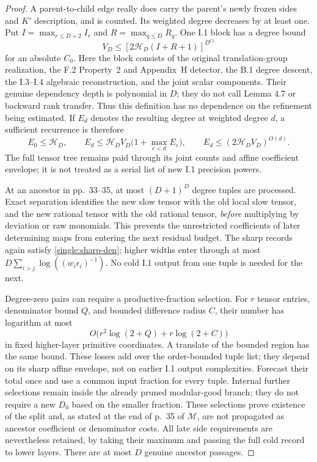 \documentclass[11pt,a4paper]{article}
\theoremstyle{definition}
\newcommand{\M}{\mathcal M}
\begin{document}
\begin{proof}
A parent-to-child edge really does carry the parent's newly
frozen sides and \(K'\) description, and is counted. Its
weighted degree decreases by at least one. Put
\(I=\max_{r\le D+2}I_r\) and \(R=\max_{q\le D}R_q\).
One I.1 block has a degree bound
\[
 V_D\le[2\mathcal H_D(I+R+1)]^{D^{C_0}}
\]
for an absolute \(C_0\). Here the block consists of the original
translation-group realization, the F.2 Property~2 and Appendix~H
detector, the B.1 degree descent, the I.3--I.4 algebraic
reconstruction, and the joint scalar components. Their genuine
dependency depth is polynomial in \(D\); they do not call
Lemma 4.7 or backward rank transfer. Thus this definition has no
dependence on the refinement being estimated. If \(E_d\) denotes
the resulting degree at weighted degree \(d\), a sufficient
recurrence is therefore
\begin{equation}\label{single:major-depth}
 E_0\le \mathcal H_D,\qquad
 E_d\le \mathcal H_DV_D\bigl(1+\max_{e<d}E_e\bigr),
 \qquad E_d\le(2\mathcal H_DV_D)^{O(d)}.
\end{equation}
The full tensor tree remains paid through its joint counts and
affine coefficient envelope; it is not treated as a serial list
of new I.1 precision powers.

At an ancestor in pp.~33--35, at most \((D+1)^D\) degree tuples
are processed. Exact separation identifies the new slow tensor
with the old local slow tensor, and the new rational tensor with
the old rational tensor, \emph{before} multiplying by deviation
or raw monomials. This prevents the unrestricted coefficients of
later determining maps from entering the next residual budget.
The sharp records again satisfy \eqref{single:sharp-den}; higher
widths enter through at most \(D\sum_{i>j}\log((w_i\epsilon_i)^{-1})\).
No cold I.1 output from one tuple is needed for the next.

Degree-zero pairs can require a productive-fraction selection.
For \(r\) tensor entries, denominator bound \(Q\), and bounded
difference radius \(C\), their number has logarithm at most
\[
 O\bigl(r^2\log(2+Q)+r\log(2+C)\bigr)
\]
in fixed higher-layer primitive coordinates. A translate of the
bounded region has the same bound. These losses add over the
order-bounded tuple list; they depend on its sharp affine envelope,
not on earlier I.1 output complexities. Forecast their total once
and use a common input fraction for every tuple. Internal further
selections remain inside the already pruned modular-good branch;
they do not require a new \(D_0\) based on the smaller fraction.
These selections prove existence of the split and, as stated at the end
of p.~35 of \(\M\), are not propagated as ancestor coefficient
or denominator costs. All late side requirements are nevertheless
retained, by taking their maximum and passing the full cold record
to lower layers. There are at most \(D\) genuine ancestor passages.


\end{proof}
\end{document}
